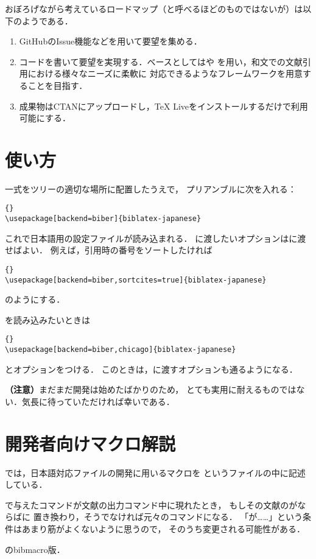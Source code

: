 \documentclass[lualatex,ja=standard,magstyle=real]{bxjsarticle}
\begin{document}
おぼろげながら考えているロードマップ（と呼べるほどのものではないが）は以下のようである．
\begin{enumerate}
\item GitHubのIssue機能などを用いて要望を集める．
\item コードを書いて要望を実現する．ベースとしてはや
  を用い，和文での文献引用における様々なニーズに柔軟に
  対応できるようなフレームワークを用意することを目指す．
\item 成果物はCTANにアップロードし，\TeX{} Liveをインストールするだけで利用可能にする．
\end{enumerate}

\section{使い方}
一式をツリーの適切な場所に配置したうえで，
プリアンブルに次を入れる：
\begin{lstlisting}[style=latex]{}
\usepackage[backend=biber]{biblatex-japanese}
\end{lstlisting}
これで日本語用の設定ファイルが読み込まれる．
に渡したいオプションはに渡せばよい．
例えば，引用時の番号をソートしたければ
\begin{lstlisting}[style=latex]{}
\usepackage[backend=biber,sortcites=true]{biblatex-japanese}
\end{lstlisting}
のようにする．

を読み込みたいときは
\begin{lstlisting}[style=latex]{}
\usepackage[backend=biber,chicago]{biblatex-japanese}
\end{lstlisting}
とオプションをつける．
このときは，に渡すオプションも通るようになる．

\noindent\textbf{（注意）}まだまだ開発は始めたばかりのため，
とても実用に耐えるものではない．気長に待っていただければ幸いである．

\section{開発者向けマクロ解説}
では，日本語対応ファイルの開発に用いるマクロを
というファイルの中に記述している．

\begin{ltxsyntax}

  で与えたコマンドが文献の出力コマンド中に現れたとき，
  もしその文献のがならばに
  置き換わり，そうでなければ元々のコマンドになる．
  「が……」という条件はあまり筋がよくないように思うので，
  そのうち変更される可能性がある．


  のbibmacro版．
\end{ltxsyntax}
\end{document}
